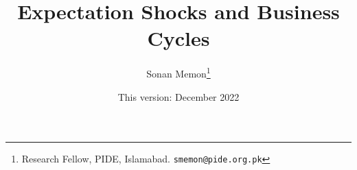 \documentclass[12pt]{article}
\newcommand{\1}{\mathbbm 1}
\begin{document}
	
	
	
	
	
	
	\vspace{-0.5ex}
	
	
	
	
	
	
	
	
	\newpage{}
	
	
	
	
	
	
	\title{{Expectation Shocks and Business Cycles
			}}
			
			
			
			\date{This version: December 2022}%
		
		
		\author{Sonan Memon\footnote{Research Fellow, PIDE, Islamabad. \texttt{smemon@pide.org.pk}}}
		
		
		
		\newpage{}
		
		\maketitle
		\vspace{-2ex}
		
		
		
		
		
		
		
		
		
\end{document}
